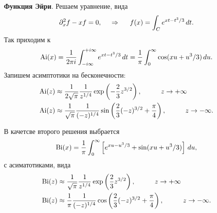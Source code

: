 \textbf{Функция Эйри}. Решаем уравнение, вида
\begin{equation*}
    \partial_x^2 f - x f = 0,
    \hspace{0.5cm} \Rightarrow \hspace{0.5cm}
    f(x) = \int_C e^{x t - t^3/3} \, d t.
\end{equation*}
Так приходим к
\begin{equation*}
    \textnormal{Ai} (x) = 
    \frac{1}{2 \pi i} \int_{- i \infty}^{+i \infty} e^{xt - t^3/3} \, d t= 
    \frac{1}{\pi} \int_{0}^{\infty} \cos(x u + u^3/3) \, d u.
\end{equation*}
Запишем асимптотики на бесконечности:
\begin{align*}
    \Ai(z) &\approx \frac{1}{2 \sqrt{\pi}} \frac{1}{z^{1/4}} \exp\left(
        - \frac{2}{3} z^{3/2}
    \right), \hspace{10 mm}  z \to +\infty\\
    \Ai(z) &\approx \frac{1}{\sqrt{\pi}} \frac{1}{(-z)^{1/4}} \sin\left(
        \frac{2}{3} (-z)^{3/2} + \frac{\pi}{4}
    \right),
    \hspace{10 mm} z \to - \infty.
\end{align*}

В качетсве второго решения выбрается 
\begin{equation*}
    \textnormal{Bi} (x) = \frac{1}{\pi} \int_{0}^{\infty} \left[
        e^{xu - u^3/3}  + \sin (xu + u^3/3)
    \right]\, d u,
\end{equation*}
с асиматотиками, вида
\begin{align*}
    \Bi(z) &\approx \frac{1}{\sqrt{\pi}} \frac{1}{z^{1/4}} \exp\left( \frac{2}{3} z^{3/2}
    \right), \hspace{10 mm} z \to +\infty \\
    \Bi(z) &\approx  \frac{1}{\pi} \frac{1}{(-z)^{1/4}} \cos\left(\frac{2}{3}(-z)^{3/2} + \frac{\pi}{4}\right), \hspace{10 mm} z \to -\infty.
\end{align*}
